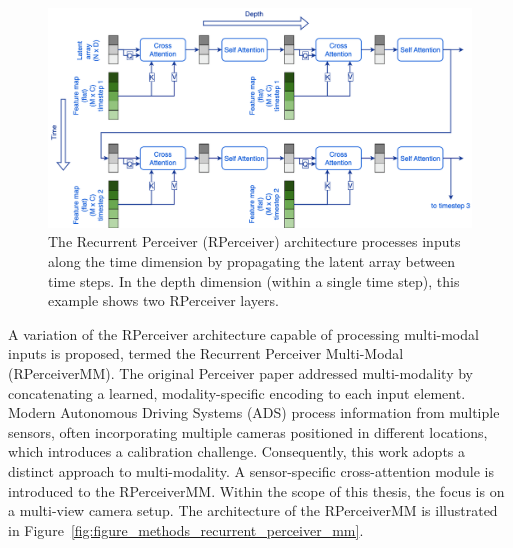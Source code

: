 \begin{figure}
    \centering
    \includegraphics[width=\textwidth]{figures/figure_methods_recurrent_perceiver.png}
    \caption{The Recurrent Perceiver (RPerceiver) architecture processes inputs along the time dimension by propagating the latent array between time steps. In the depth dimension (within a single time step), this example shows two RPerceiver layers.}
    \label{fig:figure_methods_recurrent_perceiver}
\end{figure}

A variation of the RPerceiver architecture capable of processing multi-modal inputs is proposed, termed the Recurrent Perceiver Multi-Modal (RPerceiverMM). The original Perceiver paper \cite{jaeglePerceiverGeneralPerception2021} addressed multi-modality by concatenating a learned, modality-specific encoding to each input element. Modern Autonomous Driving Systems (ADS) process information from multiple sensors, often incorporating multiple cameras positioned in different locations, which introduces a calibration challenge. Consequently, this work adopts a distinct approach to multi-modality. A sensor-specific cross-attention module is introduced to the RPerceiverMM. Within the scope of this thesis, the focus is on a multi-view camera setup. The architecture of the RPerceiverMM is illustrated in Figure~\ref{fig:figure_methods_recurrent_perceiver_mm}.

